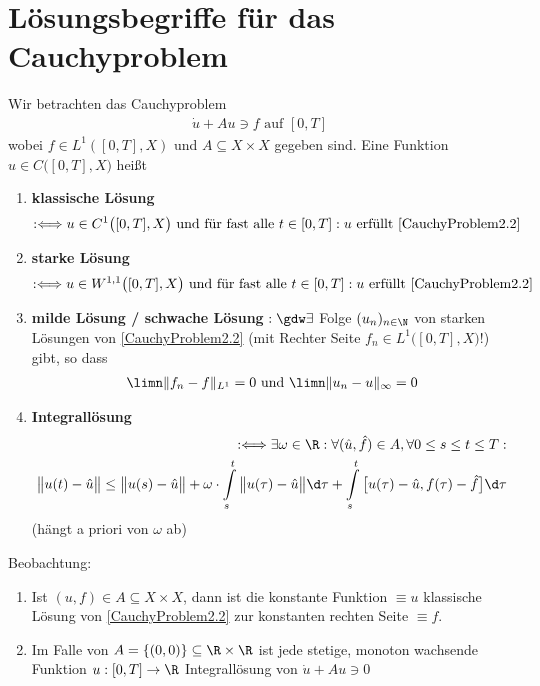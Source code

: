 \section*{Lösungsbegriffe für das Cauchyproblem} %
Wir betrachten das Cauchyproblem
\begin{align}\label{CauchyProblem2.2}\tag{CP}
\dot{u}+Au\ni f\text{ auf }[0,T] 
\end{align}
wobei $f\in L^1([0,T],X)$ und $A\subseteq X\times X$ gegeben sind. Eine Funktion $u\in C\big([0,T],X)$ heißt
\begin{enumerate}[label=(\alph*)]
\item \textbf{klassische Lösung}
\begin{align*}
:\Longleftrightarrow u\in C^1\big([0,T],X\big)\text{ und für fast alle }t\in[0,T]:u\text{ erfüllt }\eqref{CauchyProblem2.2}
\end{align*}
\item \textbf{starke Lösung}
\begin{align*}
:\Longleftrightarrow u\in W^{1,1}\big([0,T],X\big)\text{ und für fast alle }t\in[0,T]:u\text{ erfüllt }\eqref{CauchyProblem2.2}
\end{align*}
\item \textbf{milde Lösung / schwache Lösung} $:\gdw\exists$ Folge $(u_n)_{n\in\N}$ von starken Lösungen von \eqref{CauchyProblem2.2} (mit Rechter Seite $f_n\in L^1\big([0,T],X\big)$!) gibt, so dass
\begin{align*}
\limn\Vert f_n-f\Vert_{L^1}=0\text{ und }\limn\Vert u_n-u\Vert_\infty=0
\end{align*}
\item \textbf{Integrallösung}
\begin{align*}
:\Longleftrightarrow\exists\omega\in\R:\forall(\hat{u},\hat{f})\in A,\forall 0\leq s\leq t\leq T:\\
\big\Vert u(t)-\hat{u}\big\Vert\leq\big\Vert u(s)-\hat{u}\big\Vert+\omega\cdot\int\limits_s^t\big\Vert u(\tau)-\hat{u}\big\Vert\d\tau+\int\limits_s^t\big[u(\tau)-\hat{u},f(\tau)-\hat{f}\big]\d\tau
\end{align*}
(hängt a priori von $\omega$ ab)
\end{enumerate}
Beobachtung:
\begin{enumerate}[label=(\alph*)]
\item Ist $(u,f)\in A\subseteq X\times X$, dann ist die konstante Funktion $\equiv u$ klassische Lösung von \eqref{CauchyProblem2.2} zur konstanten rechten Seite $\equiv f$.
\item Im Falle von $A=\lbrace(0,0)\rbrace\subseteq\R\times\R$ ist jede stetige, monoton wachsende Funktion $u:[0,T]\to\R$ %
Integrallösung von $\dot{u}+Au\ni 0$
\end{enumerate}

